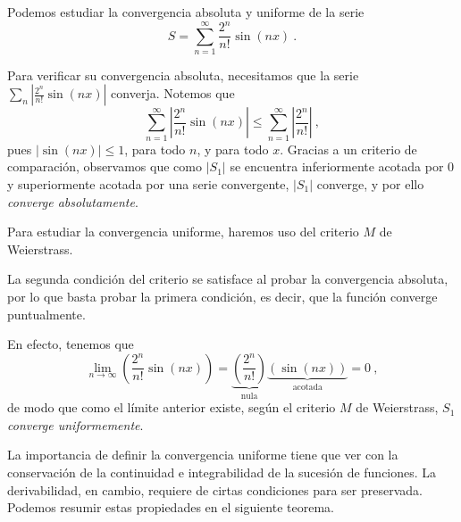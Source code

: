 \begin{ejemplo}
    Podemos estudiar la convergencia absoluta y uniforme de la serie 
    \begin{equation*}
        S = \sum_{n=1}^\infty \frac{2^n}{n!} \sin(nx) \ .
    \end{equation*}

    Para verificar su convergencia absoluta, necesitamos que la serie $\sum\limits_n \left|\frac{2^n}{n!} \sin(nx)\right|$ converja. Notemos que
    \begin{equation*}
        \sum_{n=1}^\infty \left|\frac{2^n}{n!} \sin(nx)\right| \leq \sum_{n=1}^\infty \left|\frac{2^n}{n!} \right| \ ,
    \end{equation*} 
    pues $|\sin(nx)| \leq 1$, para todo $n$, y para todo $x$. Gracias a un criterio de comparación, observamos que como $|S_1|$ se encuentra inferiormente acotada por 0 y superiormente acotada por una serie convergente, $|S_1|$ converge, y por ello \emph{converge absolutamente}.

    Para estudiar la convergencia uniforme, haremos uso del criterio $M$ de Weierstrass.

    La segunda condición del criterio se satisface al probar la convergencia absoluta, por lo que basta probar la primera condición, es decir, que la función converge puntualmente.

    En efecto, tenemos que 
    \begin{equation*}
        \lim_{n \to \infty} \left( \frac{2^n}{n!} \sin(nx) \right) = \underbrace{\left( \frac{2^n}{n!} \right)}_{\text{nula}} \underbrace{\left( \sin(nx) \right)}_{\text{acotada}} = 0 \ ,
    \end{equation*}
    de modo que como el límite anterior existe, según el criterio $M$ de Weierstrass, $S_1$ \emph{converge uniformemente}.
\end{ejemplo}

La importancia de definir la convergencia uniforme tiene que ver con la conservación de la continuidad e integrabilidad de la sucesión de funciones. La derivabilidad, en cambio, requiere de cirtas condiciones para ser preservada. Podemos resumir estas propiedades en el siguiente teorema.


